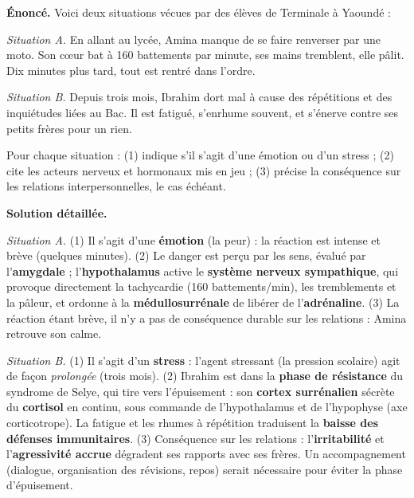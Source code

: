 \documentclass[11pt]{article}
\begin{document}
\begin{exoresolu}
\textbf{Énoncé.} Voici deux situations vécues par des élèves de Terminale à Yaoundé :

\emph{Situation A.} En allant au lycée, Amina manque de se faire renverser par une moto. Son cœur bat à 160 battements par minute, ses mains tremblent, elle pâlit. Dix minutes plus tard, tout est rentré dans l'ordre.

\emph{Situation B.} Depuis trois mois, Ibrahim dort mal à cause des répétitions et des inquiétudes liées au Bac. Il est fatigué, s'enrhume souvent, et s'énerve contre ses petits frères pour un rien.

Pour chaque situation : (1) indique s'il s'agit d'une émotion ou d'un stress ; (2) cite les acteurs nerveux et hormonaux mis en jeu ; (3) précise la conséquence sur les relations interpersonnelles, le cas échéant.

\tcblower
\textbf{Solution détaillée.}

\emph{Situation A.} (1) Il s'agit d'une \textbf{émotion} (la peur) : la réaction est intense et brève (quelques minutes). (2) Le danger est perçu par les sens, évalué par l'\textbf{amygdale} ; l'\textbf{hypothalamus} active le \textbf{système nerveux sympathique}, qui provoque directement la tachycardie (160 battements/min), les tremblements et la pâleur, et ordonne à la \textbf{médullosurrénale} de libérer de l'\textbf{adrénaline}. (3) La réaction étant brève, il n'y a pas de conséquence durable sur les relations : Amina retrouve son calme.

\emph{Situation B.} (1) Il s'agit d'un \textbf{stress} : l'agent stressant (la pression scolaire) agit de façon \emph{prolongée} (trois mois). (2) Ibrahim est dans la \textbf{phase de résistance} du syndrome de Selye, qui tire vers l'épuisement : son \textbf{cortex surrénalien} sécrète du \textbf{cortisol} en continu, sous commande de l'hypothalamus et de l'hypophyse (axe corticotrope). La fatigue et les rhumes à répétition traduisent la \textbf{baisse des défenses immunitaires}. (3) Conséquence sur les relations : l'\textbf{irritabilité} et l'\textbf{agressivité accrue} dégradent ses rapports avec ses frères. Un accompagnement (dialogue, organisation des révisions, repos) serait nécessaire pour éviter la phase d'épuisement.
\end{exoresolu}
\end{document}
